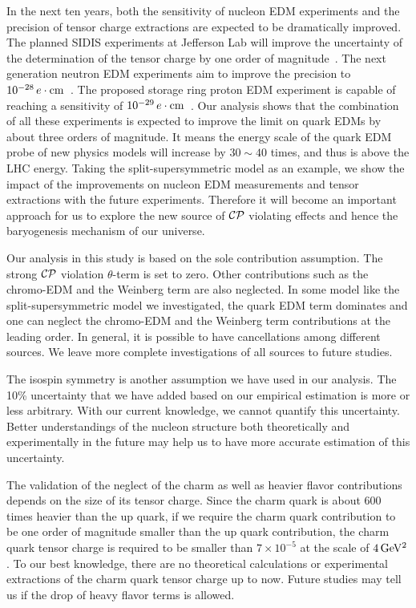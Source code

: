 \documentclass[aps,prd,twocolumn,groupedaddress,showpacs,superscriptaddress,floatfix,nofootinbib,10pt]{revtex4-1}
\begin{document}
In the next ten years, both the sensitivity of nucleon EDM experiments and the precision of tensor charge extractions are expected to be dramatically improved. The planned SIDIS experiments at Jefferson Lab will improve the uncertainty of the determination of the tensor charge by one order of magnitude~\cite{Ye:2016prn}. The next generation neutron EDM experiments aim to improve the precision to $10^{-28}\,e\cdot{\rm cm}$~\cite{nEDMexps}. The proposed storage ring proton EDM experiment is capable of reaching a sensitivity of $10^{-29}\,e\cdot{\rm cm}$~\cite{Anastassopoulos:2015ura}. Our analysis shows that the combination of all these experiments is expected to improve the limit on quark EDMs by about three orders of magnitude. It means the energy scale of the quark EDM probe of new physics models will increase by $30\sim40$ times, and thus is above the LHC energy. Taking the split-supersymmetric model as an example, we show the impact of the improvements on nucleon EDM measurements and tensor extractions with the future experiments. 
Therefore it will become an important approach for us to explore the new source of $\cal CP$ violating effects and hence the baryogenesis mechanism of our universe.

Our analysis in this study is based on the sole contribution assumption. The strong $\cal CP$ violation $\theta$-term is set to zero. Other contributions such as the chromo-EDM and the Weinberg term are also neglected. In some model like the split-supersymmetric model we investigated, the quark EDM term dominates and one can neglect the chromo-EDM and the Weinberg term contributions at the leading order. In general, it is possible to have cancellations among different sources. We leave more complete investigations of all sources to future studies.

The isospin symmetry is another assumption we have used in our analysis. The 10\% uncertainty that we have added based on our empirical estimation is more or less arbitrary. With our current knowledge, we cannot quantify this uncertainty. Better understandings of the nucleon structure both theoretically and experimentally in the future may help us to have more accurate estimation of this uncertainty.

The validation of the neglect of the charm as well as heavier flavor contributions depends on the size of its tensor charge. Since the charm quark is about 600 times heavier than the up quark, if we require the charm quark contribution to be one order of magnitude smaller than the up quark contribution, the charm quark tensor charge is required to be smaller than $7\times10^{-5}$ at the scale of $4\,\rm GeV^2$. To our best knowledge, there are no theoretical calculations or experimental extractions of the charm quark tensor charge up to now. Future studies may tell us if the drop of heavy flavor terms is allowed.
\end{document}
